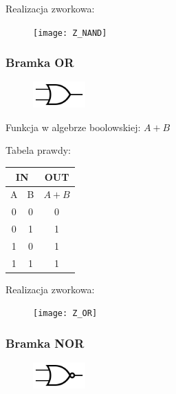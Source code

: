 \documentclass[a4paper,12pt]{article}
\begin{document}
\begin{justify}
Realizacja zworkowa:

\begin{figure}[h!]
\centering
\texttt{[image: Z\_NAND]}
\end{figure}

\subsubsection{Bramka OR}

\begin{figure}[h!]
\centering
\includegraphics[width=2cm, height=1cm]{OR}
\end{figure}

Funkcja w algebrze boolowskiej: $A + B$

Tabela prawdy:

\begin{table}[h!]
\begin{center}
\begin{scriptsize}
\begin{tabular}{|c|c|c|}
\hline
\multicolumn{2}{|c}{IN} & OUT  \\
\hline
A & B & $A + B$ \\
\hline
0 & 0 & 0 \\
0 & 1 & 1 \\
1 & 0 & 1 \\
1 & 1 & 1 \\
\hline
\end{tabular}
\end{scriptsize}
\end{center}
\end{table}

Realizacja zworkowa:

\begin{figure}[h!]
\centering
\texttt{[image: Z\_OR]}
\end{figure}

\newpage

\subsubsection{Bramka NOR}

\begin{figure}[h!]
\centering
\includegraphics[width=2cm, height=1cm]{NOR}
\end{figure}


\end{justify}
\end{document}
